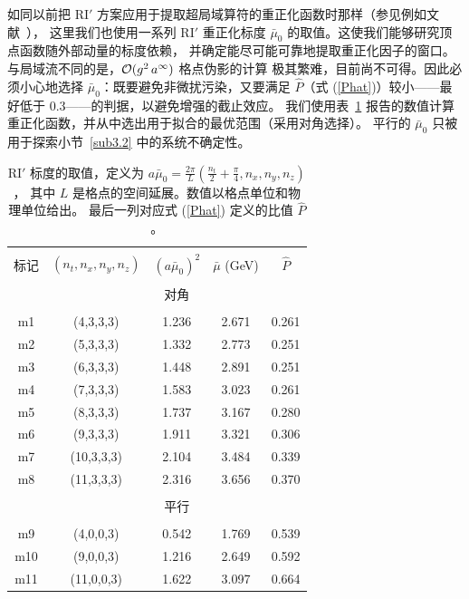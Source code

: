 \vspace*{0.35cm}
如同以前把 RI$'$ 方案应用于提取超局域算符的重正化函数时那样（参见例如文献~\cite{Alexandrou:2015sea}），
这里我们也使用一系列 RI$'$ 重正化标度 $\bar\mu_0$ 的取值。这使我们能够研究顶点函数随外部动量的标度依赖，
并确定能尽可能可靠地提取重正化因子的窗口。与局域流不同的是，${\cal O}(g^2\,a^\infty)$ 格点伪影的计算
极其繁难，目前尚不可得。因此必须小心地选择 $\bar\mu_0$：既要避免非微扰污染，又要满足
$\hat{P}$（式 (\ref{Phat})）较小——最好低于 0.3——的判据，以避免增强的截止效应。
我们使用表~\ref{tab1} 报告的数值计算重正化函数，并从中选出用于拟合的最优范围（采用对角选择）。
平行的 $\bar\mu_0$ 只被用于探索小节~\ref{sub3.2} 中的系统不确定性。

{\small{
\begin{table}[!h]
\vspace*{-0.25cm}
\begin{center}
\begin{tabular}{ccccc}
\hline
\hline\\[-2ex]
标记 & $(n_t,n_x,n_y,n_z)$   &  $(a \bar\mu_0)^2$ &  $\bar\mu$ (GeV)  &  $\hat{P}$  \\[0.5ex]
\hline
\hline\\[-2ex]
& & 对角 & & \\
\hline\\[-2ex]
 m1 &(4,3,3,3)		&1.236       &2.671	 &0.261  		\\
 m2 &(5,3,3,3)		&1.332       &2.773	 &0.251 		\\
 m3 &(6,3,3,3)		&1.448       &2.891	 &0.251		\\
 m4 &(7,3,3,3)		&1.583       &3.023	 &0.261 		\\
 m5 &(8,3,3,3)		&1.737       &3.167	 &0.280		\\
 m6 &(9,3,3,3)		&1.911        &3.321	 &0.306 		\\
 m7 &(10,3,3,3)	&2.104       &3.484 	 &0.339		\\
 m8 &(11,3,3,3)	&2.316       &3.656 	 &0.370 		\\[0.5ex]
 \hline\\[-2ex]
 & & 平行 & & \\
 \hline\\[-2ex]
 m9 &(4,0,0,3)	&0.542       &1.769 	 &0.539 		\\
 m10 &(9,0,0,3)	&1.216       &2.649 	 &0.592 		\\
 m11 &(11,0,0,3)	&1.622       &3.097 	 &0.664 		\\[0.5ex]
\hline
\hline
\end{tabular}
\vspace*{-0.4cm}
\begin{center}
\begin{minipage}{14cm}
\hspace*{3cm}
\caption{\small{RI$'$ 标度的取值，定义为
$a \bar\mu_0{=}\frac{2\pi}{L} (\frac{n_t}{2} {+} \frac{\pi}{4}, n_x,n_y,n_z)$，
其中 $L$ 是格点的空间延展。数值以格点单位和物理单位给出。
最后一列对应式 (\ref{Phat}) 定义的比值 $\hat{P}$。}}
\label{tab1}
\end{minipage}
\end{center}
\end{center}
\vspace*{-0.5cm}
\end{table}
}}

